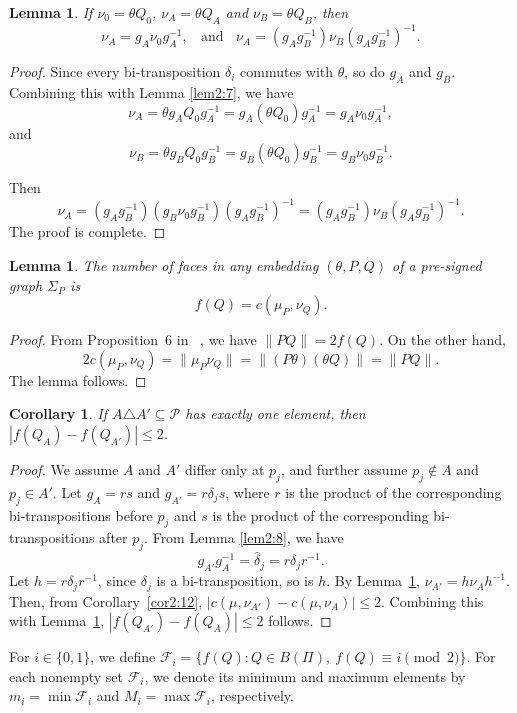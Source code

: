 \documentclass[10pt,a4paper]{amsart}
\newtheorem{corollary}[theorem]{Corollary}
\newtheorem{lemma}[theorem]{Lemma}
\begin{document}
\begin{lemma}\label{lem2:13}
If $\nu_0=\theta Q_0$, $\nu_A=\theta Q_A$ and $\nu_B=\theta Q_B$, then
$$\nu_A=g_A\nu_0g_A^{-1},~~~~\mbox{and}~~~~\nu_A=(g_Ag_B^{-1})\nu_B(g_Ag_B^{-1})^{-1}.$$
\end{lemma}
\begin{proof}
Since every bi-transposition $\delta_i$ commutes with $\theta$, so do $g_A$ and $g_B$. Combining this with Lemma \ref{lem2:7}, we have
$$\nu_A=\theta g_AQ_0g_A^{-1} =g_A(\theta Q_0)g_A^{-1} =g_A\nu_0g_A^{-1},$$and
$$\nu_B=\theta g_BQ_0g_B^{-1} =g_B(\theta Q_0)g_B^{-1} =g_B\nu_0g_B^{-1}.$$

Then $$\nu_A=(g_Ag_B^{-1})(g_B\nu_0g_B^{-1})(g_Ag_B^{-1})^{-1} =(g_Ag_B^{-1})\nu_B(g_Ag_B^{-1})^{-1}.$$
The proof is complete.
\end{proof}


\begin{lemma}\label{lem2:14} The number of faces in any embedding $(\theta,P,Q)$ of a pre-signed graph $\Sigma_P$ is $$f(Q)=c(\mu_P,\nu_Q).$$
\end{lemma}
\begin{proof}
From Proposition~6 in ~\cite{Chen2026PreSigned}, we have
$\lVert PQ\rVert=2f(Q).$ On the other hand, $$2c(\mu_P,\nu_Q)=\lVert\mu_P\nu_Q\rVert= \lVert(P\theta)(\theta Q)\rVert=\lVert PQ\rVert.$$ The lemma follows.
\end{proof}

 \begin{corollary}
\label{cor2:15}
If $A\triangle A'\subseteq\mathcal P$ has exactly one element, then
$|f(Q_A)-f(Q_{A'})|\leq 2$.
\end{corollary}

\begin{proof}
We assume $A$ and $A'$ differ only at $p_j$, and further assume $p_j\notin A$ and $p_j\in A'$.
Let $g_A=rs$ and $g_{A'}=r\delta_j s$, where $r$ is the product of the corresponding bi-transpositions
before $p_j$ and $s$ is the product of the corresponding bi-transpositions after
$p_j$. From Lemma \ref{lem2:8}, we have
$$g_{A'}g_A^{-1}=\widehat\delta_j=r\delta_jr^{-1}.$$
Let $h=r\delta_jr^{-1}$, since $\delta_j$ is a bi-transposition, so is
$h$. By Lemma~\ref{lem2:13},
$\nu_{A'}=h\nu_Ah^{-1}$. Then, from
Corollary~\ref{cor2:12},
$\bigl|c(\mu,\nu_{A'})-c(\mu,\nu_A)\bigr|\leq2$.
Combining this with Lemma~\ref{lem2:14},
$|f(Q_{A'})-f(Q_A)|\leq2$ follows.
\end{proof}

For $i\in\{0,1\}$, we define
$\mathcal F_i = \{f(Q):Q\in B(\Pi),\ f(Q)\equiv i\pmod 2\}.$
For each nonempty set $\mathcal F_i$, we denote its minimum and maximum elements by
$m_i=\min\mathcal F_i$ and $M_i=\max\mathcal F_i$, respectively.
\end{document}
